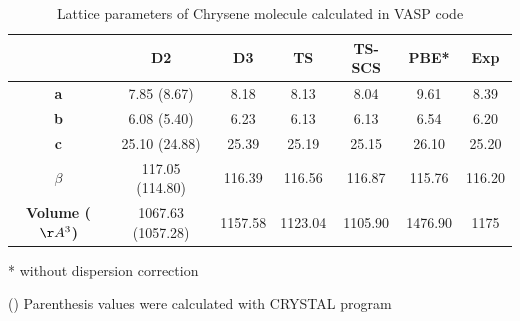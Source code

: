  		\begin{table}[H]
 			\caption{Lattice parameters of Chrysene molecule calculated in VASP code} \label{table-chrysol}
 			\begin{center}
 				\begin{threeparttable}
 				\begin{tabular}{c c c c c c c}
 					\toprule
 					& \textbf{D2} & \textbf{D3} & \textbf{TS} & \textbf{TS-SCS} & \textbf{PBE*} & \textbf{Exp} \\
 					\midrule
 					\textbf{a} & 7.85 (8.67) & 8.18 & 8.13 & 8.04 & 9.61 & 8.39\\
 					\textbf{b}& 6.08 (5.40) & 6.23 & 6.13 & 6.13 & 6.54 & 6.20\\
 					\textbf{c}& 25.10 (24.88) & 25.39 & 25.19 & 25.15 & 26.10 & 25.20\\
 					\textbf{$\beta$} & 117.05 (114.80) & 116.39 & 116.56 & 116.87& 115.76 & 116.20\\
 					\textbf{Volume ($\AA^{3}$)}& 1067.63 (1057.28)& 1157.58 & 1123.04 & 1105.90 & 1476.90 & 1175\\
 					\bottomrule
 				\end{tabular}
 				
 					\begin{tablenotes}
 						\item[*] without dispersion correction
 						\item[()] Parenthesis values were calculated with CRYSTAL program
 					\end{tablenotes}
 				\end{threeparttable}
 			\end{center}
 		\end{table}
 		
